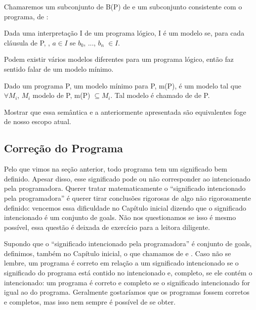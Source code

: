 \documentclass{article}
\begin{document}
  Chamaremos um subconjunto de B(P) de  e um subconjunto consistente com o programa, de :

\begin{definition} Dada uma interpretação I de um programa lógico, I é um modelo se, para cada cláusula de P, , $a \in I$ se $b_0$, ..., $b_n$ $\in I$.
\end{definition}

 Podem existir vários modelos diferentes para um programa lógico, então faz sentido falar de um modelo mínimo.

\begin{definition} Dado um programa P, um modelo mínimo para P, m(P), é um modelo tal que $\forall M_i$, $M_i$ modelo de P, m(P) $\subseteq M_i$. Tal modelo é chamado de  de P.
\end{definition}

Mostrar que essa semântica e a anteriormente apresentada são equivalentes foge de nosso escopo atual.

\subsection{Correção do Programa}

Pelo que vimos na seção anterior, todo programa tem um significado bem definido. Apesar disso, esse significado pode ou não corresponder ao intencionado pela programadora. Querer tratar matematicamente o ``significado intencionado pela programadora'' é querer tirar conclusões rigorosas de algo não rigorosamente definido: vencemos essa dificuldade no Capítulo inicial dizendo que o significado intencionado é um conjunto de goals. Não nos questionamos se
isso é mesmo possível, essa questão é deixada de exercício para a leitora diligente.

Supondo que o ``significado intencionado pela programadora'' é conjunto de goals, definimos, também no Capítulo inicial, o que chamamos de  e . Caso não se lembre, um programa é correto em relação a um significado intencionado se o significado do programa está contido no intencionado e, completo, se ele contém o intencionado: um programa é correto e completo se o significado intencionado for igual ao do programa.
Geralmente gostaríamos que os programas fossem corretos e completos, mas isso nem sempre é possível de se obter.
\end{document}
